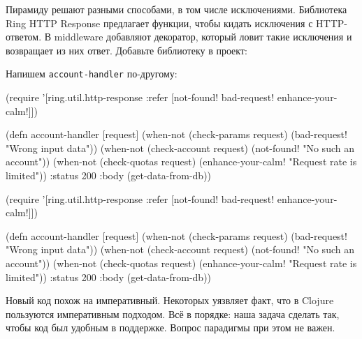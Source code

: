
Пирамиду решают разными способами, в том числе исключениями. Библиотека Ring
HTTP Response предлагает функции, чтобы кидать исключения с HTTP-ответом. В
middleware добавляют декоратор, который ловит такие исключения и возвращает из
них ответ. Добавьте библиотеку в проект:

\begin{english}
  \begin{clojure}
  \end{clojure}
\end{english}

Напишем \verb|account-handler| по-другому:


\ifx\DEVICETYPE\MOBILE

\begin{english}
  \begin{clojure}
(require '[ring.util.http-response
           :refer [not-found!
                   bad-request!
                   enhance-your-calm!]])

(defn account-handler [request]
  (when-not (check-params request)
    (bad-request! "Wrong input data"))
  (when-not (check-account request)
    (not-found! "No such an account"))
  (when-not (check-quotas request)
    (enhance-your-calm!
      "Request rate is limited"))
  {:status 200
   :body (get-data-from-db)})
  \end{clojure}
\end{english}

\else

\begin{english}
  \begin{clojure}
(require '[ring.util.http-response
           :refer [not-found!
                   bad-request!
                   enhance-your-calm!]])

(defn account-handler [request]
  (when-not (check-params request)
    (bad-request! "Wrong input data"))
  (when-not (check-account request)
    (not-found! "No such an account"))
  (when-not (check-quotas request)
    (enhance-your-calm! "Request rate is limited"))
  {:status 200
   :body (get-data-from-db)})
  \end{clojure}
\end{english}

\fi

Новый код похож на императивный. Некоторых уязвляет факт, что в Clojure
пользуются императивным подходом. Всё в порядке: наша задача сделать так, чтобы
код был удобным в поддержке. Вопрос парадигмы при этом не важен.


